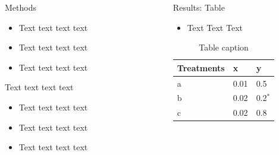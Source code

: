 \documentclass[final,hyperref={pdfpagelabels=false}]{beamer}
\begin{document}
\begin{frame}[t]
\begin{columns}[t]
\begin{column}{0.405\textwidth}
	\begin{block}{Methods}
		\begin{itemize}
			\item Text text text text
			\item Text text text text
			\item Text text text text
		\end{itemize}
		Text text text text
		\begin{itemize}
			\item Text text text text
			\item Text text text text
			\item Text text text text
		\end{itemize}
	\end{block}

\end{column} 





\begin{column}{0.02\textwidth}\end{column} %



\begin{column}{0.405\textwidth} 


	\begin{block}{Results: Table}

		\begin{itemize}
			\item Text Text Text
		\end{itemize}

		\begin{table}
			\begin{tabular}{l l l}
			\toprule
			\textbf{Treatments} & \textbf{x} & \textbf{y}\\
			\midrule
			a & 0.01 & 0.5 \\
			b & 0.02 & 0.2$^*$ \\
			c & 0.02 & 0.8 \\
			\bottomrule
			\end{tabular}
		\caption{Table caption}
		\end{table}
		   
	\end{block}




\end{column}
\end{columns}
\end{frame}
\end{document}

